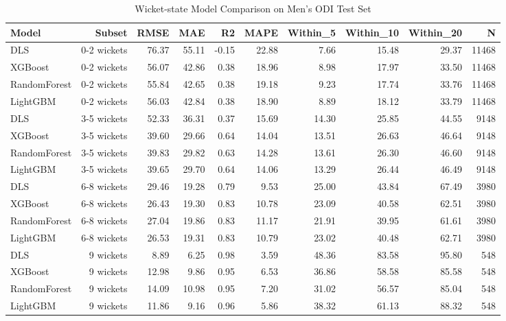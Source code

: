 \begin{table}[htbp]
\centering
\caption{Wicket-state Model Comparison on Men's ODI Test Set}
\label{tab:wicket_comparison}
\begin{tabular}{lrrrrrrrrr}
\toprule
Model & Subset & RMSE & MAE & R2 & MAPE & Within_5 & Within_10 & Within_20 & N \\
\midrule
DLS & 0-2 wickets & 76.37 & 55.11 & -0.15 & 22.88 & 7.66 & 15.48 & 29.37 & 11468 \\
XGBoost & 0-2 wickets & 56.07 & 42.86 & 0.38 & 18.96 & 8.98 & 17.97 & 33.50 & 11468 \\
RandomForest & 0-2 wickets & 55.84 & 42.65 & 0.38 & 19.18 & 9.23 & 17.74 & 33.76 & 11468 \\
LightGBM & 0-2 wickets & 56.03 & 42.84 & 0.38 & 18.90 & 8.89 & 18.12 & 33.79 & 11468 \\
DLS & 3-5 wickets & 52.33 & 36.31 & 0.37 & 15.69 & 14.30 & 25.85 & 44.55 & 9148 \\
XGBoost & 3-5 wickets & 39.60 & 29.66 & 0.64 & 14.04 & 13.51 & 26.63 & 46.64 & 9148 \\
RandomForest & 3-5 wickets & 39.83 & 29.82 & 0.63 & 14.28 & 13.61 & 26.30 & 46.60 & 9148 \\
LightGBM & 3-5 wickets & 39.65 & 29.70 & 0.64 & 14.06 & 13.29 & 26.44 & 46.49 & 9148 \\
DLS & 6-8 wickets & 29.46 & 19.28 & 0.79 & 9.53 & 25.00 & 43.84 & 67.49 & 3980 \\
XGBoost & 6-8 wickets & 26.43 & 19.30 & 0.83 & 10.78 & 23.09 & 40.58 & 62.51 & 3980 \\
RandomForest & 6-8 wickets & 27.04 & 19.86 & 0.83 & 11.17 & 21.91 & 39.95 & 61.61 & 3980 \\
LightGBM & 6-8 wickets & 26.53 & 19.31 & 0.83 & 10.79 & 23.02 & 40.48 & 62.71 & 3980 \\
DLS & 9 wickets & 8.89 & 6.25 & 0.98 & 3.59 & 48.36 & 83.58 & 95.80 & 548 \\
XGBoost & 9 wickets & 12.98 & 9.86 & 0.95 & 6.53 & 36.86 & 58.58 & 85.58 & 548 \\
RandomForest & 9 wickets & 14.09 & 10.98 & 0.95 & 7.20 & 31.02 & 56.57 & 85.04 & 548 \\
LightGBM & 9 wickets & 11.86 & 9.16 & 0.96 & 5.86 & 38.32 & 61.13 & 88.32 & 548 \\
\bottomrule
\end{tabular}
\end{table}